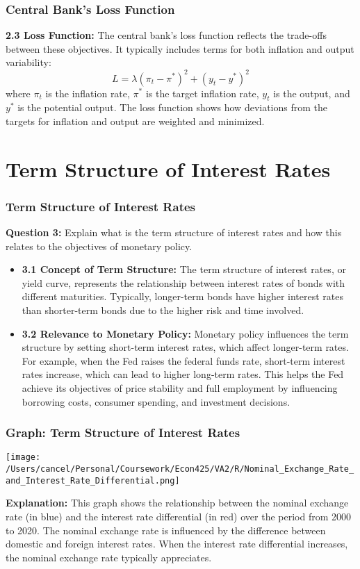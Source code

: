 \documentclass{beamer}
\begin{document}
\begin{frame}
    \frametitle{Central Bank's Loss Function}
    \textbf{2.3 Loss Function:} The central bank's loss function reflects the trade-offs between these objectives. It typically includes terms for both inflation and output variability:
    \begin{equation*}
        L = \lambda {(\pi_t - \pi^*)}^2 + {(y_t - y^*)}^2
    \end{equation*}
    where \(\pi_t\) is the inflation rate, \(\pi^*\) is the target inflation rate, \(y_t\) is the output, and \(y^*\) is the potential output. The loss function shows how deviations from the targets for inflation and output are weighted and minimized.
\end{frame}

\section{Term Structure of Interest Rates}
\begin{frame}
    \frametitle{Term Structure of Interest Rates}
    \textbf{Question 3:} Explain what is the term structure of interest rates and how this relates to the objectives of monetary policy.
    \begin{itemize}
        \item \textbf{3.1 Concept of Term Structure:} The term structure of interest rates, or yield curve, represents the relationship between interest rates of bonds with different maturities. Typically, longer-term bonds have higher interest rates than shorter-term bonds due to the higher risk and time involved.
        \item \textbf{3.2 Relevance to Monetary Policy:} Monetary policy influences the term structure by setting short-term interest rates, which affect longer-term rates. For example, when the Fed raises the federal funds rate, short-term interest rates increase, which can lead to higher long-term rates. This helps the Fed achieve its objectives of price stability and full employment by influencing borrowing costs, consumer spending, and investment decisions.
    \end{itemize}
\end{frame}

\begin{frame}
    \frametitle{Graph: Term Structure of Interest Rates}
    \begin{center}
        \texttt{[image: /Users/cancel/Personal/Coursework/Econ425/VA2/R/Nominal\_Exchange\_Rate\_and\_Interest\_Rate\_Differential.png]}
    \end{center}
    \textbf{Explanation:} This graph shows the relationship between the nominal exchange rate (in blue) and the interest rate differential (in red) over the period from 2000 to 2020. The nominal exchange rate is influenced by the difference between domestic and foreign interest rates. When the interest rate differential increases, the nominal exchange rate typically appreciates.
\end{frame}
\end{document}
